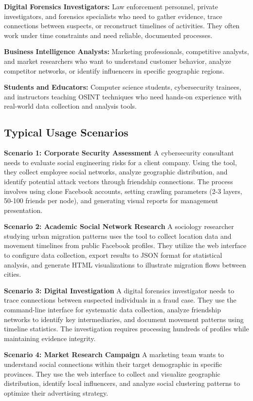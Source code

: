 \documentclass[13pt,a4paper]{report}
\begin{document}
\textbf{Digital Forensics Investigators:} Law enforcement personnel, private investigators, and forensics specialists who need to gather evidence, trace connections between suspects, or reconstruct timelines of activities. They often work under time constraints and need reliable, documented processes.

\textbf{Business Intelligence Analysts:} Marketing professionals, competitive analysts, and market researchers who want to understand customer behavior, analyze competitor networks, or identify influencers in specific geographic regions.

\textbf{Students and Educators:} Computer science students, cybersecurity trainees, and instructors teaching OSINT techniques who need hands-on experience with real-world data collection and analysis tools.

\subsection{Typical Usage Scenarios}

\textbf{Scenario 1: Corporate Security Assessment}
A cybersecurity consultant needs to evaluate social engineering risks for a client company. Using the tool, they collect employee social networks, analyze geographic distribution, and identify potential attack vectors through friendship connections. The process involves using clone Facebook accounts, setting crawling parameters (2-3 layers, 50-100 friends per node), and generating visual reports for management presentation.

\textbf{Scenario 2: Academic Social Network Research}
A sociology researcher studying urban migration patterns uses the tool to collect location data and movement timelines from public Facebook profiles. They utilize the web interface to configure data collection, export results to JSON format for statistical analysis, and generate HTML visualizations to illustrate migration flows between cities.

\textbf{Scenario 3: Digital Investigation}
A digital forensics investigator needs to trace connections between suspected individuals in a fraud case. They use the command-line interface for systematic data collection, analyze friendship networks to identify key intermediaries, and document movement patterns using timeline statistics. The investigation requires processing hundreds of profiles while maintaining evidence integrity.

\textbf{Scenario 4: Market Research Campaign}
A marketing team wants to understand social connections within their target demographic in specific provinces. They use the web interface to collect and visualize geographic distribution, identify local influencers, and analyze social clustering patterns to optimize their advertising strategy.
\end{document}
